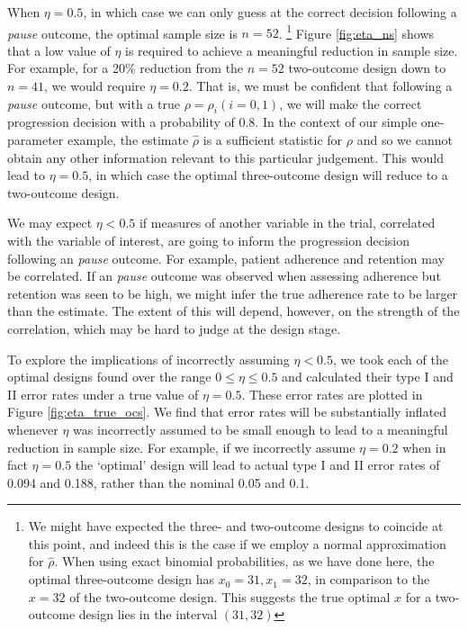 \documentclass{bmcart}
\begin{document}
When $\eta = 0.5$, in which case we can only guess at the correct decision following a \emph{pause} outcome, the optimal sample size is $n = 52$. \footnote{We might have expected the three- and two-outcome designs to coincide at this point, and indeed this is the case if we employ a normal approximation for $\hat{\rho}$. When using exact binomial probabilities, as we have done here, the optimal three-outcome design has $x_0 = 31, x_1 = 32$, in comparison to the $x = 32$ of the two-outcome design. This suggests the true optimal $x$ for a two-outcome design lies in the interval $(31, 32)$} Figure \ref{fig:eta_ns} shows that a low value of $\eta$ is required to achieve a meaningful reduction in sample size. For example, for a 20\% reduction from the $n = 52$ two-outcome design down to $n = 41$, we would require $\eta = 0.2$. That is, we must be confident that following a \emph{pause} outcome, but with a true $\rho = \rho_i (i = 0,1)$, we will make the correct progression decision with a probability of 0.8. In the context of our simple one-parameter example, the estimate $\hat{\rho}$ is a sufficient statistic for $\rho$ and so we cannot obtain any other information relevant to this particular judgement. This would lead to $\eta = 0.5$, in which case the optimal three-outcome design will reduce to a two-outcome design.

We may expect $\eta < 0.5$ if measures of another variable in the trial, correlated with the variable of interest, are going to inform the progression decision following an \emph{pause} outcome. For example, patient adherence and retention may be correlated. If an \emph{pause} outcome was observed when assessing adherence but retention was seen to be high, we might infer the true adherence rate to be larger than the estimate. The extent of this will depend, however, on the strength of the correlation, which may be hard to judge at the design stage. 

To explore the implications of incorrectly assuming $\eta < 0.5$, we took each of the optimal designs found over the range $0 \leq \eta \leq 0.5$ and calculated their type I and II error rates under a true value of $\eta = 0.5$. These error rates are plotted in Figure \ref{fig:eta_true_ocs}. We find that error rates will be substantially inflated whenever $\eta$ was incorrectly assumed to be small enough to lead to a meaningful reduction in sample size. For example, if we incorrectly assume $\eta = 0.2$ when in fact $\eta = 0.5$ the `optimal' design will lead to actual type I and II error rates of 0.094 and 0.188, rather than the nominal 0.05 and 0.1.
\end{document}
